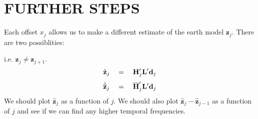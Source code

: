 \section{FURTHER STEPS}
Each offset $x_j$ allows us to make a different estimate of
the earth model $\mathbf z_j$.
There are two possiblities:

i.e. $\mathbf z_j \ne \mathbf z_{j+1}$.
\begin{equation}
\hat {\mathbf z}_j \quad =\quad \mathbf H_j' \mathbf L' \mathbf d_j
\end{equation}
\begin{equation}
\hat {\overline{\mathbf z}}_j \quad =\quad \overline{\mathbf H}_j' \mathbf L' \mathbf d_j
\end{equation}
We should plot $\hat {\mathbf z}_j$ as a function of $j$.
We should also plot
$\hat {\mathbf z}_j - \hat {\mathbf z}_{j-1}$
as a function of $j$
and see if we can find any higher temporal frequencies.

